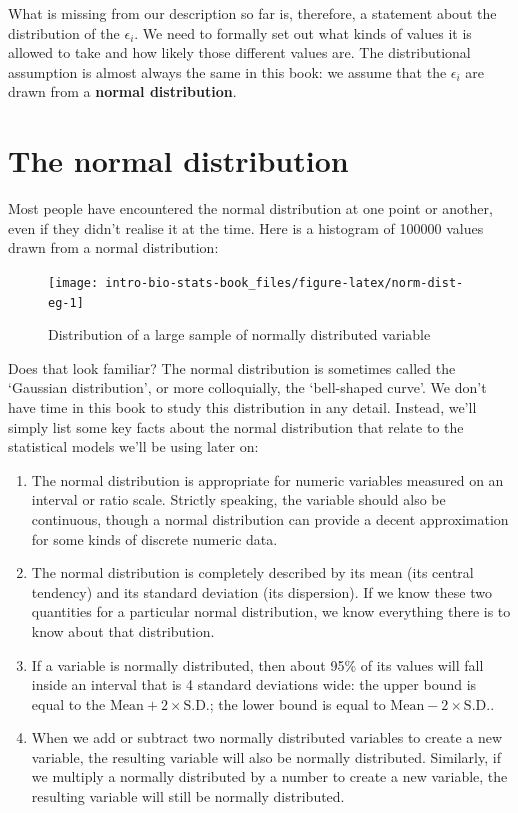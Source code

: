 \documentclass[
]{book}
\begin{document}
What is missing from our description so far is, therefore, a statement about the distribution of the \(\epsilon_i\). We need to formally set out what kinds of values it is allowed to take and how likely those different values are. The distributional assumption is almost always the same in this book: we assume that the \(\epsilon_i\) are drawn from a \textbf{normal distribution}.

\hypertarget{parametric-stats}{%
\section{The normal distribution}\label{parametric-stats}}

Most people have encountered the normal distribution at one point or another, even if they didn't realise it at the time. Here is a histogram of 100000 values drawn from a normal distribution:

\begin{figure}

{\centering \texttt{[image: intro-bio-stats-book\_files/figure-latex/norm-dist-eg-1]} 

}

\caption{Distribution of a large sample of normally distributed variable}\label{fig:norm-dist-eg}
\end{figure}

Does that look familiar? The normal distribution is sometimes called the `Gaussian distribution', or more colloquially, the `bell-shaped curve'. We don't have time in this book to study this distribution in any detail. Instead, we'll simply list some key facts about the normal distribution that relate to the statistical models we'll be using later on:

\begin{enumerate}
\def\labelenumi{\arabic{enumi}.}
\item
  The normal distribution is appropriate for numeric variables measured on an interval or ratio scale. Strictly speaking, the variable should also be continuous, though a normal distribution can provide a decent approximation for some kinds of discrete numeric data.
\item
  The normal distribution is completely described by its mean (its central tendency) and its standard deviation (its dispersion). If we know these two quantities for a particular normal distribution, we know everything there is to know about that distribution.
\item
  If a variable is normally distributed, then about 95\% of its values will fall inside an interval that is 4 standard deviations wide: the upper bound is equal to the \(\text{Mean} + 2 \times \text{S.D.}\); the lower bound is equal to \(\text{Mean} - 2 \times \text{S.D.}\).
\item
  When we add or subtract two normally distributed variables to create a new variable, the resulting variable will also be normally distributed. Similarly, if we multiply a normally distributed by a number to create a new variable, the resulting variable will still be normally distributed.
\end{enumerate}
\end{document}
